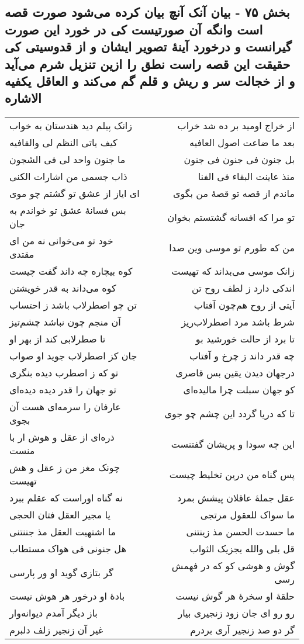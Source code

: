 \begin{center}
\section*{بخش ۷۵ - بیان آنک آنچ بیان کرده می‌شود صورت قصه است وانگه آن صورتیست کی در خورد این صورت گیرانست و درخورد آینهٔ تصویر ایشان و از قدوسیتی کی حقیقت این قصه راست نطق را ازین تنزیل شرم می‌آید و از خجالت سر و ریش و قلم گم می‌کند و العاقل یکفیه الاشاره}
\label{sec:sh075}
\begin{longtable}{l p{0.5cm} r}
زانک پیلم دید هندستان به خواب
&&
از خراج اومید بر ده شد خراب
\\
کیف یاتی النظم لی والقافیه
&&
بعد ما ضاعت اصول العافیه
\\
ما جنون واحد لی فی الشجون
&&
بل جنون فی جنون فی جنون
\\
ذاب جسمی من اشارات الکنی
&&
منذ عاینت البقاء فی الفنا
\\
ای ایاز از عشق تو گشتم چو موی
&&
ماندم از قصه تو قصهٔ من بگوی
\\
بس فسانهٔ عشق تو خواندم به جان
&&
تو مرا که افسانه گشتستم بخوان
\\
خود تو می‌خوانی نه من ای مقتدی
&&
من که طورم تو موسی وین صدا
\\
کوه بیچاره چه داند گفت چیست
&&
زانک موسی می‌بداند که تهیست
\\
کوه می‌داند به قدر خویشتن
&&
اندکی دارد ز لطف روح تن
\\
تن چو اصطرلاب باشد ز احتساب
&&
آیتی از روح هم‌چون آفتاب
\\
آن منجم چون نباشد چشم‌تیز
&&
شرط باشد مرد اصطرلاب‌ریز
\\
تا صطرلابی کند از بهر او
&&
تا برد از حالت خورشید بو
\\
جان کز اصطرلاب جوید او صواب
&&
چه قدر داند ز چرخ و آفتاب
\\
تو که ز اصطرب دیده بنگری
&&
درجهان دیدن یقین بس قاصری
\\
تو جهان را قدر دیده دیده‌ای
&&
کو جهان سبلت چرا مالیده‌ای
\\
عارفان را سرمه‌ای هست آن بجوی
&&
تا که دریا گردد این چشم چو جوی
\\
ذره‌ای از عقل و هوش ار با منست
&&
این چه سودا و پریشان گفتنست
\\
چونک مغز من ز عقل و هش تهیست
&&
پس گناه من درین تخلیط چیست
\\
نه گناه اوراست که عقلم ببرد
&&
عقل جملهٔ عاقلان پیشش بمرد
\\
یا مجیر العقل فتان الحجی
&&
ما سواک للعقول مرتجی
\\
ما اشتهیت العقل مذ جننتنی
&&
ما حسدت الحسن مذ زینتنی
\\
هل جنونی فی هواک مستطاب
&&
قل بلی والله یجزیک الثواب
\\
گر بتازی گوید او ور پارسی
&&
گوش و هوشی کو که در فهمش رسی
\\
بادهٔ او درخور هر هوش نیست
&&
حلقهٔ او سخرهٔ هر گوش نیست
\\
باز دیگر آمدم دیوانه‌وار
&&
رو رو ای جان زود زنجیری بیار
\\
غیر آن زنجیر زلف دلبرم
&&
گر دو صد زنجیر آری بردرم
\\
\end{longtable}
\end{center}
